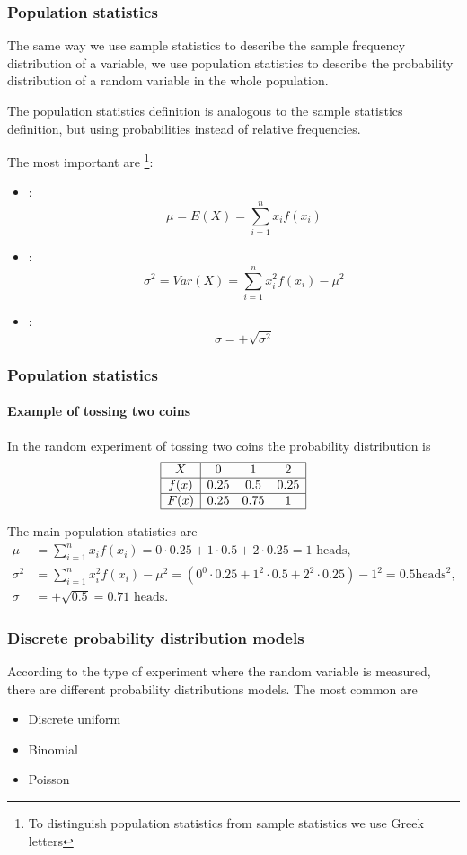 \begin{frame}
\frametitle{Population statistics}
The same way we use sample statistics to describe the sample frequency distribution of a variable, we use
population statistics to describe the probability distribution of a random variable in the whole population.

The population statistics definition is analogous to the sample statistics definition, but using probabilities
instead of relative frequencies. 

The most important are \footnote{To distinguish population statistics from sample statistics we use Greek letters}:
\begin{itemize}
\item {}:
\[
\mu = E(X) = \sum_{i=1}^n x_i f(x_i)
\]
\item {}:
\[
\sigma^2 = Var(X) = \sum_{i=1}^n x_i^2 f(x_i) -\mu^2
\]
\item {}:
\[
\sigma = +\sqrt{\sigma^2}
\]
\end{itemize}
\end{frame}


\begin{frame}
\frametitle{Population statistics}
\framesubtitle{Example of tossing two coins}
In the random experiment of tossing two coins the probability distribution is  
\[
\begin{array}{|c|ccc|}
\hline
X & 0 & 1 & 2\\ \hline
f(x) & 0.25 & 0.5 & 0.25\\
\hline
F(x) & 0.25 & 0.75 & 1 \\
\hline
\end{array}
\]

The main population statistics are 
\begin{align*}
\mu &= \sum_{i=1}^n x_i f(x_i) = 0\cdot 0.25 + 1\cdot 0.5 + 2\cdot 0.25 = 1 \mbox{ heads},\\
\sigma^2 &= \sum_{i=1}^n x_i^2 f(x_i) -\mu^2 = (0^0\cdot 0.25 + 1^2\cdot 0.5 + 2^2\cdot 0.25) - 1^2 = 0.5 \mbox{
heads}^2,\\
\sigma &= +\sqrt{0.5} = 0.71 \mbox{ heads}.
\end{align*}
\end{frame}


\begin{frame}
\frametitle{Discrete probability distribution models}
According to the type of experiment where the random variable is measured, there are different probability distributions
models. 
The most common are

\begin{itemize}
\item Discrete uniform
\item Binomial
\item Poisson 
\end{itemize}
\end{frame}


